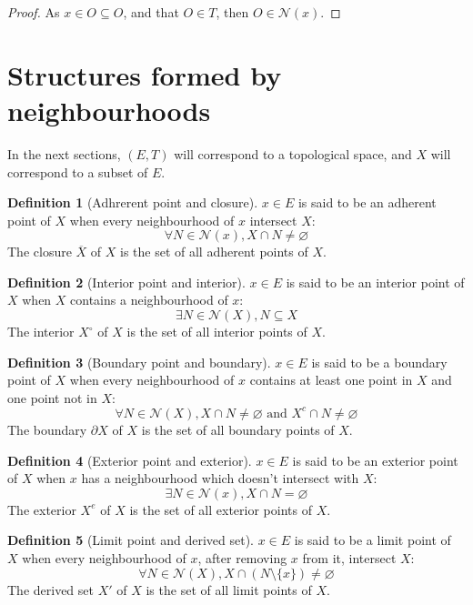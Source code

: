 \documentclass{article}
\theoremstyle{definition}
\newtheorem{definition}{Definition}[section]
\theoremstyle{remark}
\theoremstyle{example}
\theoremstyle{notation}
\newcommand{\inter}[1]{{{#1}^\circ}}
\newcommand{\adher}[1]{{\overline{#1}}}
\newcommand{\bound}[1]{{\partial #1}}
\newcommand{\exter}[1]{{{#1}^e}}
\newcommand{\limit}[1]{{{#1}'}}
\newcommand{\tand}{\text{ and }}
\begin{document}
\begin{proof}
		As $x \in O \subseteq O$, and that $O \in T$, then $O \in \mathcal{N}(x)$.
\end{proof}



\section{Structures formed by neighbourhoods}

In the next sections, $(E, T)$ will correspond to a topological space, and $X$ will correspond to a subset of $E$.

\begin{definition}[Adhrerent point and closure]
		$x \in E$ is said to be an adherent point of $X$ when every neighbourhood of $x$ intersect $X$:
				$$\forall N \in \mathcal{N}(x), X \cap N \neq \varnothing$$
		The closure $\adher{X}$ of $X$ is the set of all adherent points of $X$.
\end{definition}

\begin{definition}[Interior point and interior]
		$x \in E$ is said to be an interior point of $X$ when $X$ contains a neighbourhood of $x$:
				$$\exists N \in \mathcal{N}(X), N \subseteq X$$
		The interior $\inter{X}$ of $X$ is the set of all interior points of $X$.
\end{definition}

\begin{definition}[Boundary point and boundary]
		$x \in E$ is said to be a boundary point of $X$ when every neighbourhood of $x$ contains at least one point in $X$ and one point not in $X$:
				$$\forall N \in \mathcal{N}(X), X \cap N \neq \varnothing \tand X^c \cap N \neq \varnothing$$
		The boundary $\bound{X}$ of $X$ is the set of all boundary points of $X$.
\end{definition}

\begin{definition}[Exterior point and exterior]
		$x \in E$ is said to be an exterior point of $X$ when $x$ has a neighbourhood which doesn't intersect with $X$:
				$$\exists N \in \mathcal{N}(x), X \cap N = \varnothing$$
		The exterior $\exter{X}$ of $X$ is the set of all exterior points of $X$.
\end{definition}

\begin{definition}[Limit point and derived set]
		$x \in E$ is said to be a limit point of $X$ when every neighbourhood of $x$, after removing $x$ from it, intersect $X$:
				$$\forall N \in \mathcal{N}(X), X \cap (N \setminus \{x\}) \neq \varnothing$$
		The derived set $\limit{X}$ of $X$ is the set of all limit points of $X$.
\end{definition}
\end{document}
